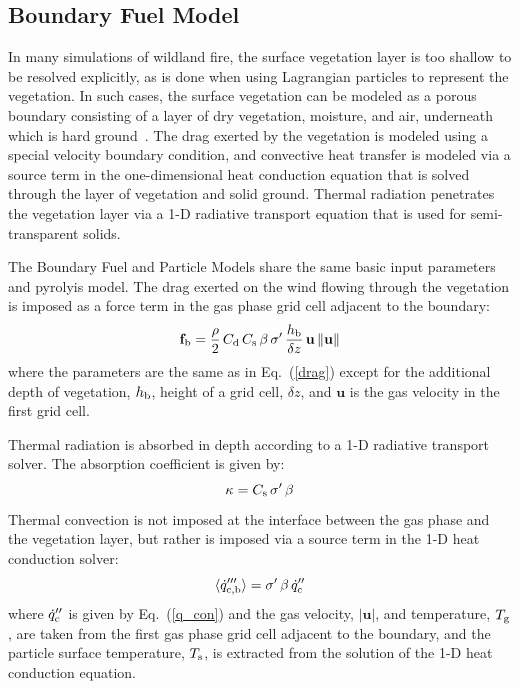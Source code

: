 \documentclass[journal,article,atmosphere,submit,moreauthors,pdftex]{Definitions_Review_Process/mdpi}
\begin{document}
\subsection{Boundary Fuel Model}

In many simulations of wildland fire, the surface vegetation layer is too shallow to be resolved explicitly, as is done when using Lagrangian particles to represent the vegetation. In such cases, the surface vegetation can be modeled as a porous boundary consisting of a layer of dry vegetation, moisture, and air, underneath which is hard ground~\cite{Mell:IJWF2007}. The drag exerted by the vegetation is modeled using a special velocity boundary condition, and convective heat transfer is modeled via a source term in the one-dimensional heat conduction equation that is solved through the layer of vegetation and solid ground. Thermal radiation penetrates the vegetation layer via a 1-D radiative transport equation that is used for semi-transparent solids.

The Boundary Fuel and Particle Models share the same basic input parameters and pyrolyis model. The drag exerted on the wind flowing through the vegetation is imposed as a force term in the gas phase grid cell adjacent to the boundary:
\begin{equation}
    \mathbf{f}_{\rm b} = \frac{\rho}{2} \, C_{\rm d} \, C_{\rm s} \, \beta \, \sigma' \, \frac{h_{\rm b}}{\delta z} \, \mathbf{u} \, \|\mathbf{u}\|
\end{equation}
where the parameters are the same as in Eq.~(\ref{drag}) except for the additional depth of vegetation, $h_{\rm b}$, height of a grid cell, $\delta z$, and $\mathbf{u}$ is the gas velocity in the first grid cell.

Thermal radiation is absorbed in depth according to a 1-D radiative transport solver. The absorption coefficient is given by:
\begin{equation}
   \kappa = C_{\rm s} \, \sigma' \, \beta
\end{equation}
Thermal convection is not imposed at the interface between the gas phase and the vegetation layer, but rather is imposed via a source term in the 1-D heat conduction solver:
\begin{equation}
   \langle \dot{q}_{\rm c,b}''' \rangle = \sigma' \, \beta \, \dot{q}_{\rm c}'' 
\end{equation}
where $\dot{q}_{\rm c}''$ is given by Eq.~(\ref{q_con}) and the gas velocity, $|\mathbf{u}|$, and temperature, $T_{\rm g}$, are taken from the first gas phase grid cell adjacent to the boundary, and the particle surface temperature, $T_{\rm s}$, is extracted from the solution of the 1-D heat conduction equation.
\end{document}
